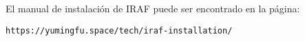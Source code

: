 \documentclass[a4paper]{article}
\begin{document}
El manual de instalaci\'on de IRAF puede ser encontrado en la p\'agina:
\begin{verbatim}
https://yumingfu.space/tech/iraf-installation/
\end{verbatim}
\end{document}

